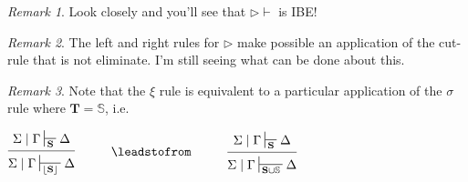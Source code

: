 \documentclass{article}                     %
\theoremstyle{theorem}
\theoremstyle{corollary}
\theoremstyle{lemma}
\theoremstyle{definition}
\theoremstyle{remark}
\newtheorem{remark}{Remark}
\theoremstyle{definition}
\theoremstyle{notation}
\theoremstyle{definition}
\theoremstyle{proposition}
\theoremstyle{definition}
\begin{document}
\begin{remark}
Look closely and you'll see that $\rhd\vdash $ is IBE! 
\end{remark}

\begin{remark}
 The left and right rules for $ \rhd $ make possible an application of the cut-rule that is not eliminate. I'm still seeing what can be done about this.
\end{remark}


\begin{remark}

 Note that the $ \xi $ rule is equivalent to a particular application of the $ \sigma $ rule where $ \mathbf{T} = \mathbb{S} $, i.e.
 
 \vspace{3mm}
 
 $
 \begin{prooftree}
 	\Hypo{\Sigma\mid\Gamma\sststile{\mathbf{S}}{}\Delta}
 	\Infer1[]{ \Sigma\mid\Gamma\sststile{\lfloor\mathbf{S}\rfloor}{} \Delta}
 \end{prooftree}
 \hspace{1cm} \leadstofrom \hspace{1cm}
 \begin{prooftree}
 	\Hypo{\Sigma\mid\Gamma\sststile{\mathbf{S}}{}\Delta}
 	\Infer1[]{ \Sigma\mid\Gamma\sststile{\mathbf{S}\cup\mathbb{S}}{} \Delta}
 \end{prooftree}
 $
\end{remark}

 \vspace{3mm}

\end{document}
